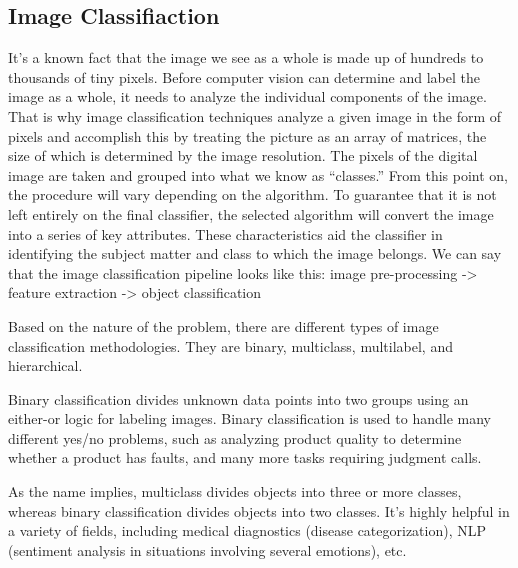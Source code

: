 \subsection*{Image Classifiaction}
	It's a known fact that the image we see as a whole is made up of hundreds to thousands of tiny pixels. Before computer vision can determine and label the image as a whole, it needs to analyze the individual components of the image. That is why image classification techniques analyze a given image in the form of pixels and accomplish this by treating the picture as an array of matrices, the size of which is determined by the image resolution. The pixels of the digital image are taken and grouped into what we know as “classes.” From this point on, the procedure will vary depending on the algorithm. To guarantee that it is not left entirely on the final classifier, the selected algorithm will convert the image into a series of key attributes. These characteristics aid the classifier in identifying the subject matter and class to which the image belongs. 
	We can say that the image classification pipeline looks like this:
	image pre-processing -> feature extraction -> object classification
	
	
	Based on the nature of the problem, there are different types of image classification methodologies. They are binary, multiclass, multilabel, and hierarchical.
	
	Binary classification divides unknown data points into two groups using an either-or logic for labeling images. Binary classification is used to handle many different yes/no problems, such as analyzing product quality to determine whether a product has faults, and many more tasks requiring judgment calls.
	
	As the name implies, multiclass divides objects into three or more classes, whereas binary classification divides objects into two classes. It's highly helpful in a variety of fields, including medical diagnostics (disease categorization), NLP (sentiment analysis in situations involving several emotions), etc.
	 
